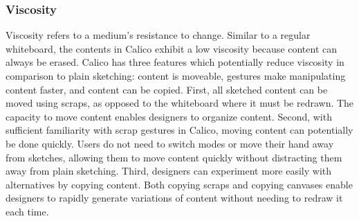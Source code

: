 \documentclass[12pt,fleqn]{ucithesis}
\begin{document}




\subsubsection{Viscosity}

Viscosity refers to a medium's resistance to change. Similar to a regular whiteboard, the contents in Calico exhibit a low viscosity because content can always be erased. Calico has three features which potentially reduce viscosity in comparison to plain sketching: content is moveable, gestures make manipulating content faster, and content can be copied. First, all sketched content can be moved using scraps, as opposed to the whiteboard where it must be redrawn. The capacity to move content enables designers to organize content. Second, with sufficient familiarity with scrap gestures in Calico, moving content can potentially be done quickly. Users do not need to switch modes or move their hand away from sketches, allowing them to move content quickly without distracting them away from plain sketching. Third, designers can experiment more easily with alternatives by copying content. Both copying scraps and copying canvases enable designers to rapidly generate variations of content without needing to redraw it each time.
\end{document}
